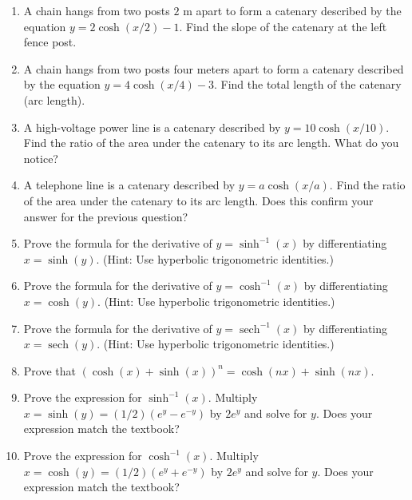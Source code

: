 \documentclass{exercises}
\begin{document}
\begin{enumerate}[resume]
\item \techrequired A chain hangs from two posts $2$ m apart to form a catenary described by the equation $y=2\cosh(x/2)-1$. Find the slope of the catenary at the left fence post.
\item \techrequired A chain hangs from two posts four meters apart to form a catenary described by the equation $y=4\cosh(x/4)-3$. Find the total length of the catenary (arc length).
\item \techrequired A high-voltage power line is a catenary described by $y=10\cosh(x/10)$. Find the ratio of the area under the catenary to its arc length. What do you notice?
\item A telephone line is a catenary described by $y=a\cosh(x/a)$. Find the ratio of the area under the catenary to its arc length. Does this confirm your answer for the previous question?
\item Prove the formula for the derivative of $y=\sinh^{-1}(x)$ by differentiating $x=\sinh(y)$. (Hint: Use hyperbolic trigonometric identities.)
\item Prove the formula for the derivative of $y=\cosh^{-1}(x)$ by differentiating $x=\cosh(y)$. (Hint: Use hyperbolic trigonometric identities.)
\item Prove the formula for the derivative of $y=\operatorname{sech}^{-1}(x)$ by differentiating $x=\operatorname{sech}(y)$. (Hint: Use hyperbolic trigonometric identities.)
\item Prove that $(\cosh(x)+\sinh(x))^{n}=\cosh(nx)+\sinh(nx)$.
\item Prove the expression for $\sinh^{-1}(x)$. Multiply $x=\sinh(y)=(1/2)(e^{y}-e^{-y})$ by $2e^{y}$ and solve for $y$. Does your expression match the textbook?
\item Prove the expression for $\cosh^{-1}(x)$. Multiply $x=\cosh(y)=(1/2)(e^{y}+e^{-y})$ by $2e^{y}$ and solve for $y$. Does your expression match the textbook?
\end{enumerate}
\end{document}
